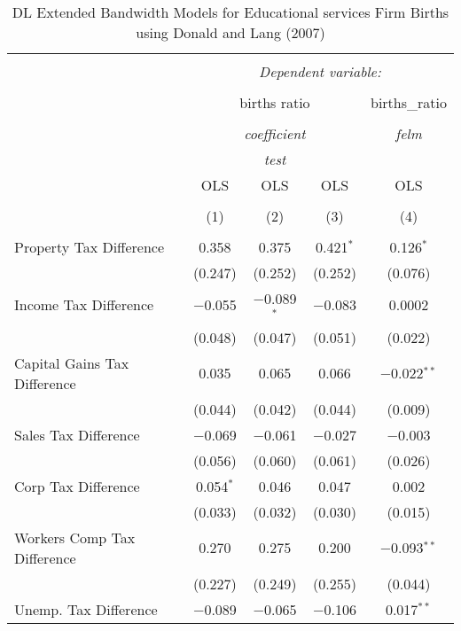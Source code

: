 
\begin{table}[!htbp] \centering 
  \caption{DL Extended Bandwidth Models for  Educational services Firm Births using Donald and Lang (2007)} 
  \label{} 
\begin{tabular}{@{\extracolsep{5pt}}lcccc} 
\\[-1.8ex]\hline 
\hline \\[-1.8ex] 
 & \multicolumn{4}{c}{\textit{Dependent variable:}} \\ 
\cline{2-5} 
\\[-1.8ex] & \multicolumn{3}{c}{births ratio} & births\_ratio \\ 
\\[-1.8ex] & \multicolumn{3}{c}{\textit{coefficient}} & \textit{felm} \\ 
 & \multicolumn{3}{c}{\textit{test}} & \textit{} \\ 
 & OLS & OLS & OLS & OLS \\ 
\\[-1.8ex] & (1) & (2) & (3) & (4)\\ 
\hline \\[-1.8ex] 
 Property Tax Difference & 0.358 & 0.375 & 0.421$^{*}$ & 0.126$^{*}$ \\ 
  & (0.247) & (0.252) & (0.252) & (0.076) \\ 
  Income Tax Difference & $-$0.055 & $-$0.089$^{*}$ & $-$0.083 & 0.0002 \\ 
  & (0.048) & (0.047) & (0.051) & (0.022) \\ 
  Capital Gains Tax Difference & 0.035 & 0.065 & 0.066 & $-$0.022$^{**}$ \\ 
  & (0.044) & (0.042) & (0.044) & (0.009) \\ 
  Sales Tax Difference & $-$0.069 & $-$0.061 & $-$0.027 & $-$0.003 \\ 
  & (0.056) & (0.060) & (0.061) & (0.026) \\ 
  Corp Tax Difference & 0.054$^{*}$ & 0.046 & 0.047 & 0.002 \\ 
  & (0.033) & (0.032) & (0.030) & (0.015) \\ 
  Workers Comp Tax Difference & 0.270 & 0.275 & 0.200 & $-$0.093$^{**}$ \\ 
  & (0.227) & (0.249) & (0.255) & (0.044) \\ 
  Unemp. Tax Difference & $-$0.089 & $-$0.065 & $-$0.106 & 0.017$^{**}$ \\ 

\end{tabular}
\end{table}
